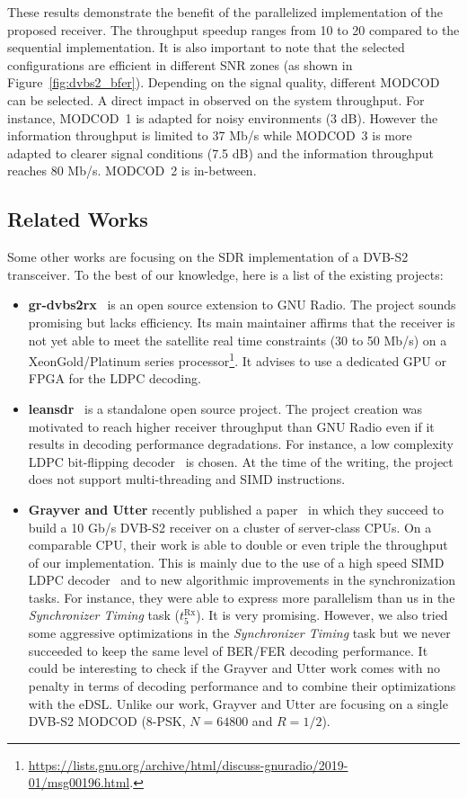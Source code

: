 These results demonstrate the benefit of the parallelized implementation of the
proposed receiver. The throughput speedup ranges from 10 to 20 compared to the
sequential implementation. It is also important to note that the selected
configurations are efficient in different SNR zones (as shown in
Figure~\ref{fig:dvbs2_bfer}). Depending on the signal quality, different MODCOD
can be selected. A direct impact in observed on the system throughput. For
instance, MODCOD~1 is adapted for noisy environments (3 dB). However the
information throughput is limited to 37 Mb/s while MODCOD~3 is more adapted to
clearer  signal conditions (7.5 dB) and the information throughput reaches
80 Mb/s. MODCOD~2 is in-between.

\subsection{Related Works}

Some other works are focusing on the SDR implementation of a DVB-S2 transceiver.
To the best of our knowledge, here is a list of the existing projects:
\begin{itemize}
  \item \textbf{gr-dvbs2rx}~\cite{gr-dvbs2rx} is an open source extension to GNU
    Radio. The project sounds promising but lacks efficiency. Its main
    maintainer affirms that the receiver is not yet able to meet the satellite
    real time constraints (30 to 50 Mb/s) on a Xeon\TM Gold/Platinum series
    processor\footnote{\url{https://lists.gnu.org/archive/html/discuss-gnuradio/2019-01/msg00196.html}.}.
    It advises to use a dedicated GPU or FPGA for the LDPC decoding.
  \item \textbf{leansdr}~\cite{leansdr} is a standalone open source project. The
    project creation was motivated to reach higher receiver throughput than GNU
    Radio even if it results in decoding performance degradations. For instance,
    a low complexity LDPC bit-flipping decoder~\cite{Ryan2009} is chosen. At the
    time of the writing, the project does not support multi-threading and SIMD
    instructions.
  \item \textbf{Grayver and Utter} recently published a paper~\cite{Grayver2020}
    in which they succeed to build a 10 Gb/s DVB-S2 receiver on a cluster of
    server-class CPUs. On a comparable CPU, their work is able to double or even
    triple the throughput of our implementation. This is mainly due to the use
    of a high speed SIMD LDPC decoder~\cite{LeGal2016,Grayver2019} and to new
    algorithmic improvements in the synchronization tasks. For instance, they
    were able to express more parallelism than us in the \emph{Synchronizer
    Timing} task ($t^\text{Rx}_{5}$). It is very promising. However, we also
    tried some aggressive optimizations in the \emph{Synchronizer Timing} task
    but we never succeeded to keep the same level of BER/FER decoding
    performance. It could be interesting to check if the Grayver and Utter work
    comes with no penalty in terms of decoding performance and to combine their
    optimizations with the \AFFECT eDSL. Unlike our work, Grayver and Utter are
    focusing on a single DVB-S2 MODCOD (8-PSK, $N = 64800$ and $R = 1/2$).
\end{itemize}

